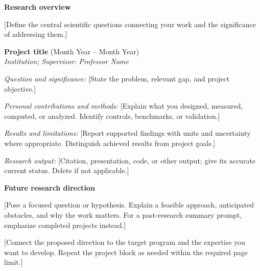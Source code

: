 \documentclass[11pt]{article}
\begin{document}
\justifying
\noindent\textbf{Research overview}

[Define the central scientific questions connecting your work and the significance of addressing them.]

\medskip
\noindent\textbf{Project title} (Month Year -- Month Year)\\
\textit{Institution; Supervisor: Professor Name}

\noindent\textit{Question and significance:} [State the problem, relevant gap, and project objective.]

\noindent\textit{Personal contributions and methods:} [Explain what you designed, measured, computed, or analyzed. Identify controls, benchmarks, or validation.]

\noindent\textit{Results and limitations:} [Report supported findings with units and uncertainty where appropriate. Distinguish achieved results from project goals.]

\noindent\textit{Research output:} [Citation, presentation, code, or other output; give its accurate current status. Delete if not applicable.]

\medskip
\noindent\textbf{Future research direction}

[Pose a focused question or hypothesis. Explain a feasible approach, anticipated obstacles, and why the work matters. For a past-research summary prompt, emphasize completed projects instead.]

[Connect the proposed direction to the target program and the expertise you want to develop. Repeat the project block as needed within the required page limit.]
\end{document}

